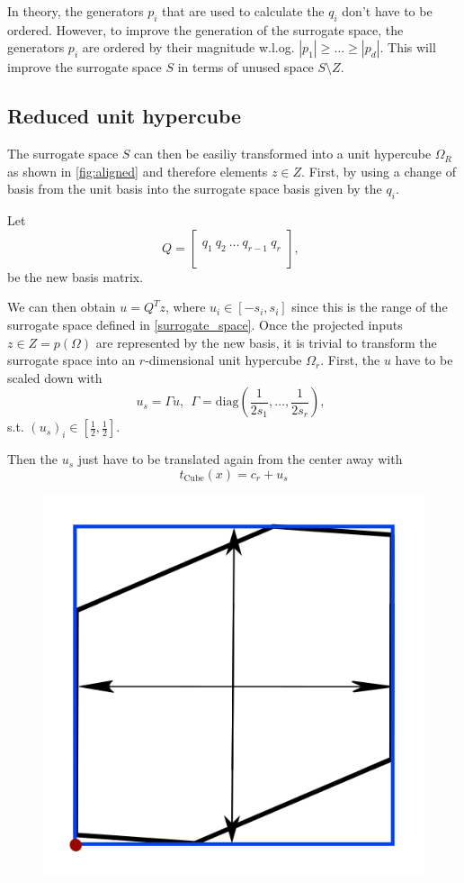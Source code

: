 \documentclass[
  a4paper,  %
  twoside,  %
  bibliography=totoc,
  headsepline,
  cleardoublepage=empty,
  parskip=half,
  draft=false
]{scrbook}
\begin{document}
In theory, the generators $p_i$ that are used to calculate the $q_i$ don't have to be ordered.
However, to improve the generation of the surrogate space, the generators $p_i$ are ordered by their magnitude w.l.og. $|p_1|\geq \dots \geq |p_d|$.
This will improve the surrogate space $S$ in terms of unused space $S \setminus Z$.


\subsection{Reduced unit hypercube}

The surrogate space $S$ can then be easiliy transformed into a unit hypercube $\Omega_R$ as shown in \ref{fig:aligned} and therefore elements $z \in Z$.
First, by using a change of basis from the unit basis into the surrogate space basis given by the $q_i$.

Let
\begin{equation}
Q=\begin{bmatrix}
  \\
    q_1 ~ q_2 ~ \dots ~q_{r-1} ~ q_r\\
    \\
  \end{bmatrix}
  , ~~
\label{alignment}
\end{equation}
be the new basis matrix.

We can then obtain $u=Q^T z$, where $u_i \in [-s_i,s_i]$ since this is the range of the surrogate space defined in \ref{surrogate_space}.
Once the projected inputs $z \in Z=p(\Omega)$ are represented by the new basis, it is trivial to transform the surrogate space into an $r$-dimensional unit hypercube $\Omega_r$.
First, the $u$ have to be scaled down with
\begin{equation}
u_s=\Gamma u, ~~ \Gamma=\text{diag}(\frac{1}{2 s_1}, \dots, \frac{1}{2 s_r}), ~~
\label{alignment}
\end{equation}
s.t. $(u_s)_i \in [\frac{1}{2},\frac{1}{2}]$.

Then the $u_s$ just have to be translated again from the center away with
\begin{equation}
t_{\text{Cube}}(x)=c_r + u_s
\end{equation}

\begin{figure}[H]
\centering
  \includegraphics[width=0.4\linewidth]{graphics/s_unit}
  \label{fig:f2_combined_rel_errors_inter}
\end{figure}
\end{document}
